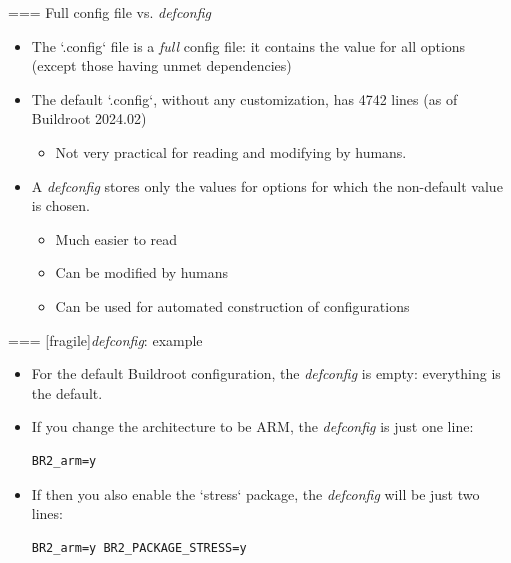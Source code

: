 === {Full config file vs. {\em defconfig}}
  \begin{itemize}
  \item The `.config` file is a {\em full} config file: it
    contains the value for all options (except those having unmet
    dependencies)
  \item The default `.config`, without any customization, has
    4742 lines (as of Buildroot 2024.02)
    \begin{itemize}
    \item Not very practical for reading and modifying by humans.
    \end{itemize}
  \item A {\em defconfig} stores only the values for options for which
    the non-default value is chosen.
    \begin{itemize}
    \item Much easier to read
    \item Can be modified by humans
    \item Can be used for automated construction of configurations
    \end{itemize}
  \end{itemize}


=== [fragile]{{\em defconfig}: example}
  \begin{itemize}
  \item For the default Buildroot configuration, the {\em defconfig}
    is empty: everything is the default.
  \item If you change the architecture to be ARM, the {\em defconfig}
    is just one line:
{\small
\begin{block}{}
\begin{verbatim}
BR2_arm=y
\end{verbatim}
\end{block}
}
  \item If then you also enable the `stress` package, the {\em
      defconfig} will be just two lines:
{\small
\begin{block}{}
\begin{verbatim}
BR2_arm=y BR2_PACKAGE_STRESS=y
\end{verbatim}
\end{block}
}
  \end{itemize}


